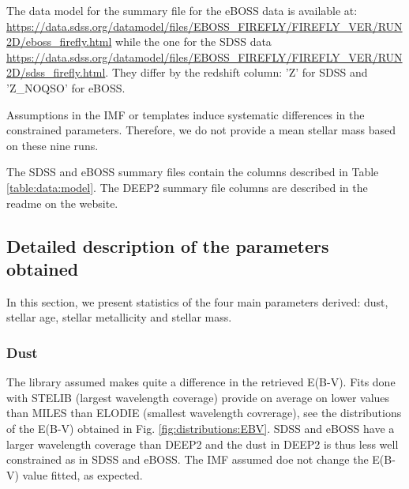 \documentclass[onecolumn]{aa}
\begin{document}
The data model for the summary file for the eBOSS data is available at: 
\url{https://data.sdss.org/datamodel/files/EBOSS_FIREFLY/FIREFLY_VER/RUN2D/eboss_firefly.html} while the one for the SDSS data \url{https://data.sdss.org/datamodel/files/EBOSS_FIREFLY/FIREFLY_VER/RUN2D/sdss_firefly.html}.
They differ by the redshift column: 'Z' for SDSS and 'Z\_NOQSO' for eBOSS.  

Assumptions in the IMF or templates induce systematic differences in the constrained parameters. 
Therefore, we do not provide a mean stellar mass based on these nine runs.


The SDSS and eBOSS summary files contain the columns described in Table \ref{table:data:model}. The DEEP2 summary file columns are described in the readme on the website.


\subsection{Detailed description of the parameters obtained}
In this section, we present statistics of the four main parameters derived: dust, stellar age, stellar metallicity and stellar mass.

\subsubsection{Dust}
The library assumed makes quite a difference in the retrieved E(B-V). 
Fits done with STELIB (largest wavelength coverage) provide on average on lower values than MILES than ELODIE (smallest wavelength covrerage), see the distributions of the E(B-V) obtained in Fig. \ref{fig:distributions:EBV}. 
SDSS and eBOSS have a larger wavelength coverage than DEEP2 and the dust in DEEP2 is thus less well constrained as in SDSS and eBOSS. 
The IMF assumed doe not change the E(B-V) value fitted, as expected.
\end{document}
